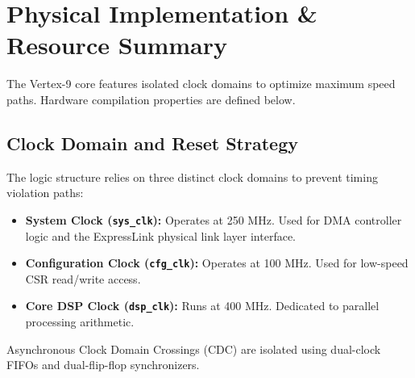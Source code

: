 \section{Physical Implementation \& Resource Summary}
The Vertex-9 core features isolated clock domains to optimize maximum speed paths. Hardware compilation properties are defined below.

\subsection{Clock Domain and Reset Strategy}
The logic structure relies on three distinct clock domains to prevent timing violation paths:
\begin{itemize}
    \item \textbf{System Clock (\texttt{sys\_clk}):} Operates at 250 MHz. Used for DMA controller logic and the ExpressLink physical link layer interface.
    \item \textbf{Configuration Clock (\texttt{cfg\_clk}):} Operates at 100 MHz. Used for low-speed CSR read/write access.
    \item \textbf{Core DSP Clock (\texttt{dsp\_clk}):} Runs at 400 MHz. Dedicated to parallel processing arithmetic.
\end{itemize}
Asynchronous Clock Domain Crossings (CDC) are isolated using dual-clock FIFOs and dual-flip-flop synchronizers.

